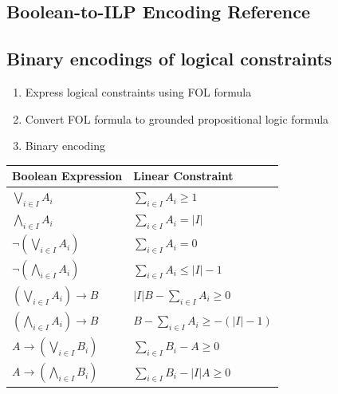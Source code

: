 \documentclass[8pt]{extarticle}
\theoremstyle{definition}
\begin{document}
\begin{multicols*}{2}
\section{Boolean-to-ILP Encoding Reference}\label{app:boolean}
\subsection{Binary encodings of logical constraints}
\begin{enumerate}
  \item Express logical constraints using FOL formula
  \item Convert FOL formula to grounded propositional logic formula
  \item Binary encoding
\end{enumerate}
\begin{table}[H]
\centering
\small
\setlength{\tabcolsep}{3pt}

\begin{tabularx}{\linewidth}{@{}Y{1}Y{1}@{}}
\hline
\textbf{Boolean Expression} & \textbf{Linear Constraint} \\
\hline

$\displaystyle \bigvee_{i\in I} A_i$
&
$\displaystyle \sum_{i\in I} A_i \ge 1$
\\[6pt]

$\displaystyle \bigwedge_{i\in I} A_i$
&
$\displaystyle \sum_{i\in I} A_i = |I|$
\\[6pt]

$\displaystyle \neg\left(\bigvee_{i\in I} A_i\right)$
&
$\displaystyle \sum_{i\in I} A_i = 0$
\\[6pt]

$\displaystyle \neg\left(\bigwedge_{i\in I} A_i\right)$
&
$\displaystyle \sum_{i\in I} A_i \le |I|-1$
\\[6pt]

$\displaystyle
\left(\bigvee_{i\in I} A_i\right)\rightarrow B$
&
$\displaystyle
|I|B-\sum_{i\in I}A_i \ge 0$
\\[6pt]

$\displaystyle
\left(\bigwedge_{i\in I} A_i\right)\rightarrow B$
&
$\displaystyle
B-\sum_{i\in I}A_i \ge -( |I|-1)$
\\[6pt]

$\displaystyle
A\rightarrow\left(\bigvee_{i\in I}B_i\right)$
&
$\displaystyle
\sum_{i\in I}B_i-A\ge0$
\\[6pt]

$\displaystyle
A\rightarrow\left(\bigwedge_{i\in I}B_i\right)$
&
$\displaystyle
\sum_{i\in I}B_i-|I|A\ge0$
\\


\end{tabularx}
\end{table}
\end{multicols*}
\end{document}
